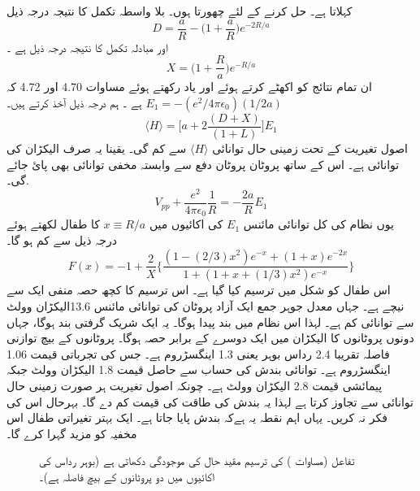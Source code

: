 کہلاتا ہے۔ حل کرنے کے لئے چھورتا ہوں۔ بلا واسطہ تکمل کا نتیجہ درجہ ذیل 
\[D=\frac{a}{R}-\big(1+\frac{a}{R}\big)e^{-2R/a}\]
اور مبادلہ تکمل کا نتیجہ درجہ ذیل ہے ۔ 
\[X=\big(1+\frac{R}{a}\big)e^{-R/a}\]
ان تمام نتائج کو اکھٹے کرتے ہوئے اور یاد رکھتے ہوئے مساوات 4.70 اور 4.72 کہ 
\(E_{1}=-(e^{2}/4\pi\epsilon_{0})(1/2a)\)
ہے ۔ ہم درجہ ذیل آخذ کرتے ہیں۔
\[\langle H \rangle =\big[a+2\frac{(D+X)}{(1+L)}\big]E_{1}\]
اصول تغیریت کے تحت زمینی حال توانائی  
\(\langle H \rangle\)
 سے کم گی۔ یقینا  یہ صرف الیکڑان کی توانائی ہے۔ اس کے ساتھ پروٹان پروٹان دفع سے وابستہ مخفی توانائی بھی پائ جائے گی۔.
\[V_{pp}+\frac{e^{2}}{4\pi\epsilon_{0}}\frac{1}{R}=-\frac{2a}{R}E_{1}\]
یوں نظام کی  کل توانائی مائنس
\(E_{1}\)
  کی  اکائیوں میں 
  \(x\equiv R/a\)
  کا طفال لکھتے ہوئے درجہ ذیل سے کم ہو گا۔
  \[F(x)=-1+\frac{2}{X}\big\{\frac{(1-(2/3)x^{2})e^{-x}+(1+x)e^{-2x}}{1+(1+x+(1/3)x^{2})e^{-x}}\big\}\]
اس طفال کو شکل     میں ترسیم کیا گیا ہے۔ اس ترسیم کا کچھ حصہ منفی ایک سے نیچے ہے۔ جہاں معدل جوہر جمع ایک آزاد پروٹان کی توانائی مائنس  13.6الیکڑان وولٹ سے توانائی کم ہے۔ لہذا اس نظام میں بند پیدا ہوگا۔ یہ ایک شریک گرفتی بند ہوگا، جہاں دونوں پروٹانوں کا الیکڑان میں ایک دوسرے کے برابر حصہ ہوگا۔ پروٹانوں کے بیچ توازنی فاصلہ تقریبا 2.4 رداس بوہر یعنی 1.3 اینگسڑروم ہے۔ جس کی تجرباتی قیمت 1.06 اینگسڑروم ہے۔ توانائی بندش کی حساب سے حاصل قیمت 1.8 الیکڑان وولٹ جبکہ پیمائشی قیمت 2.8 الیکڑان وولٹ ہے۔ چونکہ اصول تغیریت ہر صورت زمینی حال توانائی سے تجاوز کرتا ہے لہذا یہ بندش کی طاقت کی قیمت کم دے گا۔ بہرحال اس کی فکر نہ کریں۔ یہاں اہم نقطہ یہ ہےکہ بندش پایا جاتا ہے۔ ایک بہتر تغیراتی طفال اس مخفیہ کو مزید گہرا کرے گا۔ 
\begin{figure}
\centering
{}
\caption{تفاعل  (مساوات )  کی ترسیم  مقید حال کی موجودگی دکھاتی ہے (بوہر رداس کی اکائیوں میں  دو پروٹانوں کے بیچ فاصلہ ہے)۔ }
\label{شکل_تغیریت_مقید_حال}
\end{figure}


